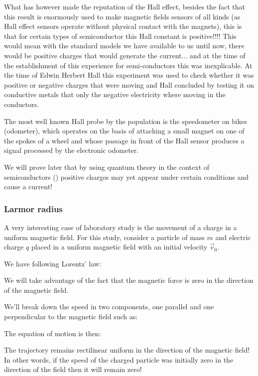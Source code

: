 	What has however made the reputation of the Hall effect, besides the fact that this result is enormously used to make magnetic fields sensors of all kinds (as Hall effect sensors operate without physical contact with the magnets), this is that for certain types of semiconductor this Hall constant is positive!!!! This would mean with the standard models we have available to us until now, there would be positive charges that would generate the current... and at the time of the establishment of this experience for semi-conductors this was inexplicable. At the time of  Edwin Herbert  Hall this experiment was used to check whether it was positive or negative charges that were moving and Hall concluded by testing it on conductive metals that only the negative electricity where moving in the conductors.
	\begin{tcolorbox}[title=Remark,colframe=black,arc=10pt]
	The most well known Hall probe by the population is the speedometer on bikes (odometer), which operates on the basis of attaching a small magnet on one of the spokes of a wheel and whose passage in front of the Hall sensor produces a signal processed by the electronic odometer.
	\end{tcolorbox}
	We will prove later that by using quantum theory in the context of semiconductors () positive charges may yet appear under certain conditions and cause a current!
	
	\subsubsection{Larmor radius}
	A very interesting case of laboratory study is the movement of a charge in a uniform magnetic field. For this study, consider a particle of mass $m$ and electric charge $q$ placed in a uniform magnetic field with an initial velocity $\vec{v}_0$.

	We have following Lorentz' law:
	
	We will take advantage of the fact that the magnetic force is zero in the direction of the magnetic field.

	We'll break down the speed in two components, one parallel and one perpendicular to the magnetic field such as:
	
	The equation of motion is then:
	
	The trajectory remains rectilinear uniform in the direction of the magnetic field! In other words, if the speed of the charged particle was initially zero in the direction of the field then it will remain zero!
	
